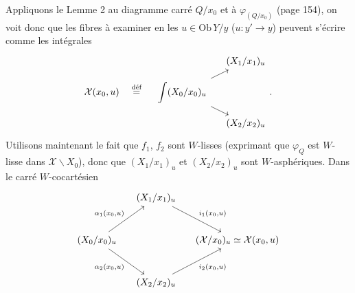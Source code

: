 \documentclass[11pt]{article}
\newcommand{\intdiag}[3]{\begin{tikzcd}[row sep=small,column sep=small,ampersand replacement=\&,baseline=(\tikzcdmatrixname-2-1.base)]
 \& #2 \\
 \displaystyle\int #1 \arrow[ur] \arrow[dr] \& \\
 \& #3
\end{tikzcd}}
\begin{document}
Appliquons le Lemme 2 au diagramme carré $Q/x_0$ et à $\varphi_{(Q/x_0)}$ (page 154), on voit donc que les fibres à examiner en les $u\in\mathrm{Ob}\,Y/y$ ($u : y'\longrightarrow y$) peuvent s'écrire comme les intégrales
\[
\mathcal{X}(x_0,u) \quad\overset{\text{déf}}{=}\quad \intdiag{(X_0/x_0)_u}{(X_1/x_1)_u}{(X_2/x_2)_u} .
\]
Utilisons maintenant le fait que $f_1$, $f_2$ sont $W$-lisses (exprimant que $\varphi_Q$ est $W$-lisse dans $\mathcal{X}\backslash X_0$), donc que $(X_1/x_1)_u$ et $(X_2/x_2)_u$ sont $W$-asphériques. Dans le carré $W$-cocartésien
\[
\begin{tikzcd}[row sep=large,column sep=small]
 & (X_1/x_1)_u \arrow[dr, "{i_1(x_0,u)}"] & \\
(X_0/x_0)_u \arrow[ur, "{\alpha_1(x_0,u)}"] \arrow[dr, "{\alpha_2(x_0,u)}"'] & & (\mathcal{X}/x_0)_u\simeq\mathcal{X}(x_0,u) \\
 & (X_2/x_2)_u \arrow[ur, "{i_2(x_0,u)}"'] &
\end{tikzcd}
\]
\end{document}
